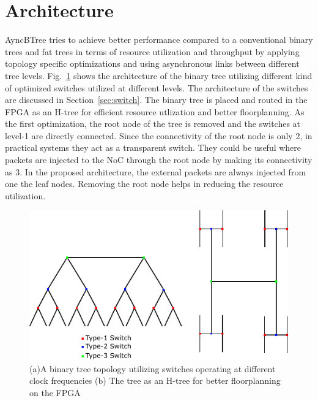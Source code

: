 \section{Architecture}
\label{sec:arch}

AyncBTree tries to achieve better performance compared to a conventional binary trees and fat trees in terms of resource utilization and throughput by applying topology specific optimizations and using asynchronous links between different tree levels.
Fig.~\ref{fig:btree} shows the architecture of the binary tree utilizing different kind of optimized switches utilized at different levels.
The architecture of the switches are discussed in Section~\ref{sec:switch}.
The binary tree is placed and routed in the FPGA as an H-tree for efficient resource utlization and better floorplanning.
As the first optimization, the root node of the tree is removed and the switches at level-1 are directly connected.
Since the connectivity of the root node is only 2, in practical systems they act as a transparent switch.
They could be useful where packets are injected to the NoC through the root node by making its connectivity as 3.
In the proposed architecture, the external packets are always injected from one the leaf nodes.
Removing the root node helps in reducing the resource utilization.

\begin{figure}[t]
\centering
   \includegraphics[width=\columnwidth]{Figures/HNoC.pdf}
   \caption{(a)A binary tree topology utilizing switches operating at different clock frequencies (b) The tree as an H-tree for better floorplanning on the FPGA}
   \label{fig:btree}
\end{figure}

